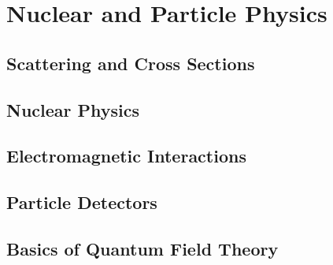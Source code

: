 \documentclass{book}
\begin{document}


\tableofcontents
\part{Nuclear and Particle Physics}
	\chapter{Scattering and Cross Sections}
	
	\chapter{Nuclear Physics}
	
	\chapter{Electromagnetic Interactions}
	
	\chapter{Particle Detectors}
	
	\chapter{Basics of Quantum Field Theory}
	
%	
%	
%		
\end{document}
